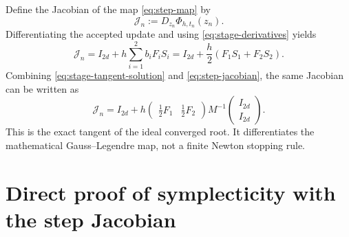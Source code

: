 \documentclass[11pt,a4paper]{article}
\newcommand{\Id}{I}
\newcommand{\Jn}{\mathcal{J}_n}
\newcommand{\Phih}{\Phi_{h,t_n}}
\begin{document}
Define the Jacobian of the map \eqref{eq:step-map} by
\[
 \Jn:=D_{z_n}\Phih(z_n).
\]
Differentiating the accepted update and using
\eqref{eq:stage-derivatives} yields
\begin{equation}
 \boxed{
 \Jn=\Id_{2d}+h\sum_{i=1}^2b_iF_iS_i
 =\Id_{2d}+\frac h2\left(F_1S_1+F_2S_2\right).
 }
 \label{eq:step-jacobian}
\end{equation}
Combining \eqref{eq:stage-tangent-solution} and
\eqref{eq:step-jacobian}, the same Jacobian can be written as
\begin{equation}
 \boxed{
 \Jn
 =\Id_{2d}
 +h
 \begin{pmatrix}\frac12F_1&\frac12F_2\end{pmatrix}
 M^{-1}
 \begin{pmatrix}\Id_{2d}\\\Id_{2d}\end{pmatrix}.
 }
 \label{eq:explicit-step-jacobian}
\end{equation}
This is the exact tangent of the ideal converged root.  It differentiates the
mathematical Gauss--Legendre map, not a finite Newton stopping rule.

\clearpage

\section{Direct proof of symplecticity with the step Jacobian}
\end{document}
